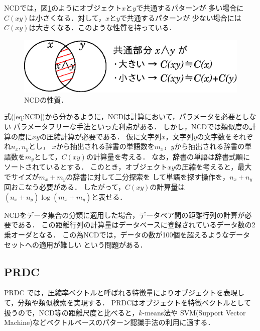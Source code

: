 NCDでは，図\ref{ncd}のようにオブジェクト$x$と$y$で共通するパターンが
多い場合に$C(xy)$は小さくなる．対して，$x$と$y$で共通するパターンが
少ない場合には$C(xy)$は大きくなる．このような性質を持っている．

\begin{figure}[tb]
\begin{center}
\includegraphics[width=13.5cm]{image/ncd.eps}
\end{center}
\caption{NCDの性質．}
\label{ncd}
\end{figure}

式(\ref{eq:NCD})から分かるように，NCDは計算において，パラメータを必要としない
パラメータフリーな手法といった利点がある．
しかし，NCDでは類似度の計算の度に$xy$の圧縮計算が必要である．
仮に文字列$x$，文字列$y$の文字数をそれぞれ$n_x, n_y$とし，
$x$から抽出される辞書の単語数を$m_x$，$y$から抽出される辞書の単語数を$m_y$として，$C(xy)$の計算量を考える．
なお，辞書の単語は辞書式順にソートされているとする．
このとき，オブジェクト$xy$の圧縮を考えると，最大でサイズが$m_x + m_y$の辞書に対して二分探索を
して単語を探す操作を，$n_x + n_y$回おこなう必要がある．
したがって，$C(xy)$の計算量は$(n_x + n_y)\log(m_x + m_y)$と表せる．

NCDをデータ集合の分類に適用した場合，データペア間の距離行列の計算が必要である．
この距離行列の計算量はデータベースに登録されているデータ数の2乗オーダとなる．
この為NCDでは，データの数が100個を超えるようなデータセットへの適用が難しい
という問題がある．




\subsection{PRDC}
PRDC \cite{PRDC} では，圧縮率ベクトルと呼ばれる特徴量によりオブジェクトを表現して，分類や類似検索を実現する．
PRDCはオブジェクトを特徴ベクトルとして扱うので，NCD等の距離尺度と比べると，$k$-means法や
SVM(Support Vector Machine)などベクトルベースのパターン認識手法の利用に適する．

